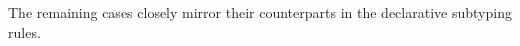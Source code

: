\documentclass[acmsmall]{acmart}
\begin{document}
The remaining cases closely mirror their counterparts in the declarative subtyping rules.

\end{document}
